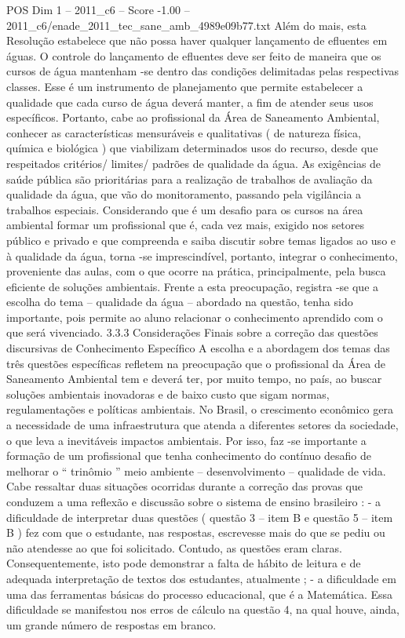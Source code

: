 \begin{textsample}{POS Dim 1 – 2011\_c6 – Score -1.00 – 2011\_c6/enade\_2011\_tec\_sane\_amb\_4989e09b77.txt}
Além do mais, esta Resolução estabelece que não possa haver qualquer lançamento de efluentes em águas.
O controle do lançamento de efluentes deve ser feito de maneira que os cursos de água mantenham -se dentro das condições delimitadas pelas respectivas classes.
Esse é um instrumento de planejamento que permite estabelecer a qualidade que cada curso de água deverá manter, a fim de atender seus usos específicos.
Portanto, cabe ao profissional da Área de Saneamento Ambiental, conhecer as características mensuráveis e qualitativas ( de natureza física, química e biológica ) que viabilizam determinados usos do recurso, desde que respeitados critérios/ limites/ padrões de qualidade da água.
As exigências de saúde pública são prioritárias para a realização de trabalhos de avaliação da qualidade da água, que vão do monitoramento, passando pela vigilância a trabalhos especiais.
Considerando que é um desafio para os cursos na área ambiental formar um profissional que é, cada vez mais, exigido nos setores público e privado e que compreenda e saiba discutir sobre temas ligados ao uso e à qualidade da água, torna -se imprescindível, portanto, integrar o conhecimento, proveniente das aulas, com o que ocorre na prática, principalmente, pela busca eficiente de soluções ambientais.
Frente a esta preocupação, registra -se que a escolha do tema – qualidade da água – abordado na questão, tenha sido importante, pois permite ao aluno relacionar o conhecimento aprendido com o que será vivenciado. 3.3.3 Considerações Finais sobre a correção das questões discursivas de Conhecimento Específico A escolha e a abordagem dos temas das três questões específicas refletem na preocupação que o profissional da Área de Saneamento Ambiental tem e deverá ter, por muito tempo, no país, ao buscar soluções ambientais inovadoras e de baixo custo que sigam normas, regulamentações e políticas ambientais.
No Brasil, o crescimento econômico gera a necessidade de uma infraestrutura que atenda a diferentes setores da sociedade, o que leva a inevitáveis impactos ambientais.
Por isso, faz -se importante a formação de um profissional que tenha conhecimento do contínuo desafio de melhorar o “ trinômio ” meio ambiente – desenvolvimento – qualidade de vida.
Cabe ressaltar duas situações ocorridas durante a correção das provas que conduzem a uma reflexão e discussão sobre o sistema de ensino brasileiro : - a dificuldade de interpretar duas questões ( questão 3 – item B e questão 5 – item B ) fez com que o estudante, nas respostas, escrevesse mais do que se pediu ou não atendesse ao que foi solicitado.
Contudo, as questões eram claras.
Consequentemente, isto pode demonstrar a falta de hábito de leitura e de adequada interpretação de textos dos estudantes, atualmente ; - a dificuldade em uma das ferramentas básicas do processo educacional, que é a Matemática.
Essa dificuldade se manifestou nos erros de cálculo na questão 4, na qual houve, ainda, um grande número de respostas em branco.

\end{textsample}
